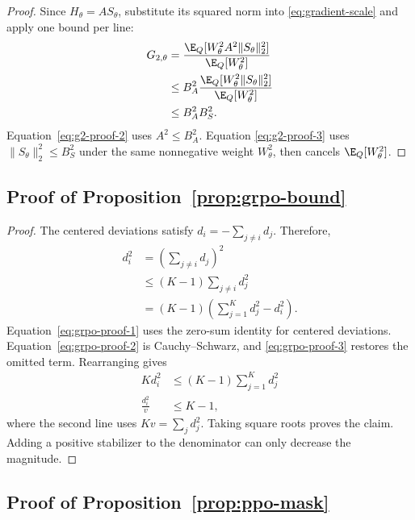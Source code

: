 \begin{proof}
Since $H_\theta=A S_\theta$, substitute its squared norm into
\eqref{eq:gradient-scale} and apply one bound per line:
\begin{align}
  G_{2,\theta}
  &=\frac{\E_Q[W_\theta^2 A^2\|S_\theta\|_2^2]}
          {\E_Q[W_\theta^2]}
    \label{eq:g2-proof-1}\\
  &\le B_A^2
    \frac{\E_Q[W_\theta^2\|S_\theta\|_2^2]}
         {\E_Q[W_\theta^2]}
    \label{eq:g2-proof-2}\\
  &\le B_A^2B_S^2.
    \label{eq:g2-proof-3}
\end{align}
Equation~\eqref{eq:g2-proof-2} uses $A^2\le B_A^2$.  Equation
\eqref{eq:g2-proof-3} uses $\|S_\theta\|_2^2\le B_S^2$ under the same
nonnegative weight $W_\theta^2$, then cancels $\E_Q[W_\theta^2]$.
\end{proof}

\subsection{Proof of Proposition~\ref{prop:grpo-bound}}

\begin{proof}
The centered deviations satisfy $d_i=-\sum_{j\ne i}d_j$.  Therefore,
\begin{align}
  d_i^2
  &=\left(\sum_{j\ne i}d_j\right)^2
    \label{eq:grpo-proof-1}\\
  &\le (K-1)\sum_{j\ne i}d_j^2
    \label{eq:grpo-proof-2}\\
  &=(K-1)\left(\sum_{j=1}^K d_j^2-d_i^2\right).
    \label{eq:grpo-proof-3}
\end{align}
Equation~\eqref{eq:grpo-proof-1} uses the zero-sum identity for centered
deviations.  Equation~\eqref{eq:grpo-proof-2} is Cauchy--Schwarz, and
\eqref{eq:grpo-proof-3} restores the omitted term.  Rearranging gives
\begin{align}
  Kd_i^2
  &\le (K-1)\sum_{j=1}^K d_j^2
    \label{eq:grpo-proof-4}\\
  \frac{d_i^2}{v}
  &\le K-1,
    \label{eq:grpo-proof-5}
\end{align}
where the second line uses $Kv=\sum_jd_j^2$.  Taking square roots proves the
claim.  Adding a positive stabilizer to the denominator can only decrease the
magnitude.
\end{proof}

\subsection{Proof of Proposition~\ref{prop:ppo-mask}}

